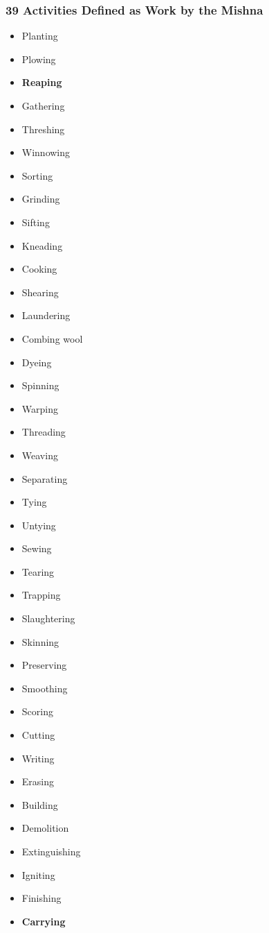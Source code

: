 \begin{frame}
\frametitle{39 Activities Defined as Work by the Mishna}
\begin{multicols}{3}
\begin{itemize}
\item Planting
\item Plowing
\item \textbf{Reaping}
\item Gathering
\item Threshing
\item Winnowing
\item Sorting
\item Grinding
\item Sifting
\item Kneading
\item Cooking
\item Shearing
\item Laundering
\item Combing wool
\item Dyeing
\item Spinning
\item Warping
\item Threading
\item Weaving
\item Separating
\item Tying
\item Untying
\item Sewing
\item Tearing
\item Trapping
\item Slaughtering
\item Skinning
\item Preserving
\item Smoothing
\item Scoring
\item Cutting
\item Writing
\item Erasing
\item Building
\item Demolition
\item Extinguishing
\item Igniting
\item Finishing
\item \textbf{Carrying}
\end{itemize}
\end{multicols}
\end{frame}


